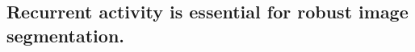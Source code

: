 \documentclass[12pt]{article}
\begin{document}






\subsection{Recurrent activity is essential for robust image segmentation.}
\end{document}
